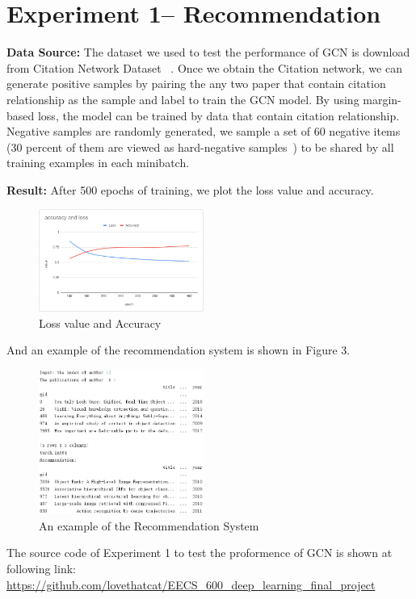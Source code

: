 \section{Experiment 1-- Recommendation}
\label{sec-expt1, for recommendation task}

\textbf{Data Source: }The dataset we used to test the performance of GCN is download from Citation Network Dataset ~\cite{Tang:08KDD}. Once we obtain the Citation network, we can generate positive samples by pairing the any two paper that contain citation relationship as the sample and label to train the GCN model. By using margin-based loss, the model can be trained by data that contain citation relationship. Negative samples are randomly generated, we sample a set of 60 negative items (30 percent of them are viewed as hard-negative samples~\cite{pintest}) to be shared by all training examples in each minibatch.

\textbf{Result: }After 500 epochs of training, we plot the loss value and accuracy.
\begin{figure}[!htb]
    \centering
    \includegraphics[width=0.48\textwidth]{accandloss.png}
    \caption{Loss value and Accuracy}
    \label{fig:accandloss}
\end{figure}
And an example of the recommendation system is shown in Figure 3. 
\begin{figure}[!htb]
    \centering
    \includegraphics[width=0.48\textwidth]{demo.png}
    \caption{An example of the Recommendation System}
    \label{fig:demo}
\end{figure}
The source code of Experiment 1 to test the proformence of GCN is shown at following link: \url{https://github.com/lovethatcat/EECS_600_deep_learning_final_project}